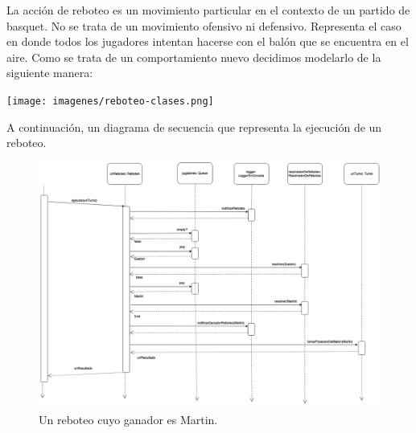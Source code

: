 La acción de reboteo es un movimiento particular en el contexto de un partido de basquet. No se trata de un movimiento ofensivo ni defensivo.
Representa el caso en donde todos los jugadores intentan hacerse con el balón que se encuentra en el aire. Como se trata de un comportamiento nuevo decidimos
modelarlo de la siguiente manera:

\begin{center}
  \texttt{[image: imagenes/reboteo-clases.png]}
\end{center}

A continuación, un diagrama de secuencia que representa la ejecución de un reboteo.

\begin{landscape}

  \begin{figure}[h!]
   \includegraphics[scale=0.5]{imagenes/reboteo.png}
   \caption{Un reboteo cuyo ganador es Martin.}
  \end{figure}

\end{landscape}


